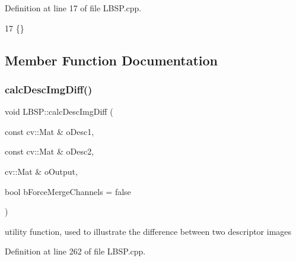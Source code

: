 Definition at line 17 of file L\+B\+S\+P.\+cpp.


\begin{DoxyCode}
17 \{\}
\end{DoxyCode}


\subsection{Member Function Documentation}
\mbox{\label{class_l_b_s_p_a5d390a2a6f3d94a4edadae3718daf884}} 
\subsubsection{\texorpdfstring{calc\+Desc\+Img\+Diff()}{calcDescImgDiff()}}
{\footnotesize\ttfamily void L\+B\+S\+P\+::calc\+Desc\+Img\+Diff (\begin{DoxyParamCaption}\item[{const cv\+::\+Mat \&}]{o\+Desc1,  }\item[{const cv\+::\+Mat \&}]{o\+Desc2,  }\item[{cv\+::\+Mat \&}]{o\+Output,  }\item[{bool}]{b\+Force\+Merge\+Channels = {\ttfamily false} }\end{DoxyParamCaption})\hspace{0.3cm}{\ttfamily [static]}}



utility function, used to illustrate the difference between two descriptor images 



Definition at line 262 of file L\+B\+S\+P.\+cpp.


